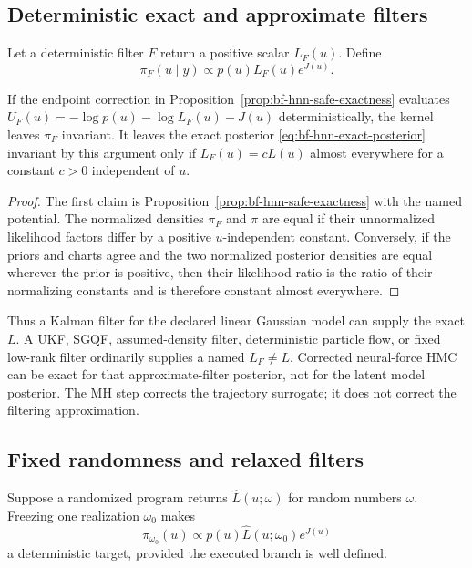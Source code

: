 \subsection{Deterministic exact and approximate filters}

Let a deterministic filter $F$ return a positive scalar $L_F(u)$.  Define
\begin{equation}
 \pi_F(u\mid y)\propto p(u)L_F(u)e^{J(u)}.
 \label{eq:bf-hnn-filter-posterior}
\end{equation}

\begin{proposition}
\label{prop:bf-hnn-filter-relative-exactness}
If the endpoint correction in
Proposition~\ref{prop:bf-hnn-safe-exactness} evaluates
$U_F(u)=-\log p(u)-\log L_F(u)-J(u)$ deterministically, the kernel leaves
$\pi_F$ invariant.  It leaves the exact posterior
\eqref{eq:bf-hnn-exact-posterior} invariant by this argument only if
$L_F(u)=cL(u)$ almost everywhere for a constant $c>0$ independent of $u$.
\end{proposition}

\begin{proof}
The first claim is Proposition~\ref{prop:bf-hnn-safe-exactness} with the named
potential.  The normalized densities $\pi_F$ and $\pi$ are equal if their
unnormalized likelihood factors differ by a positive $u$-independent constant.
Conversely, if the priors and charts agree and the two normalized posterior
densities are equal wherever the prior is positive, then their likelihood
ratio is the ratio of their normalizing constants and is therefore constant
almost everywhere.
\end{proof}

Thus a Kalman filter for the declared linear Gaussian model can supply the
exact $L$.  A UKF, SGQF, assumed-density filter, deterministic particle flow,
or fixed low-rank filter ordinarily supplies a named $L_F\ne L$.  Corrected
neural-force HMC can be exact for that approximate-filter posterior, not for
the latent model posterior.  The MH step corrects the trajectory surrogate; it
does not correct the filtering approximation.

\subsection{Fixed randomness and relaxed filters}

Suppose a randomized program returns
$\widehat L(u;\omega)$ for random numbers $\omega$.  Freezing one realization
$\omega_0$ makes
\begin{equation}
 \pi_{\omega_0}(u)\propto p(u)\widehat L(u;\omega_0)e^{J(u)}
 \label{eq:bf-hnn-fixed-randomness-target}
\end{equation}
a deterministic target, provided the executed branch is well defined.

